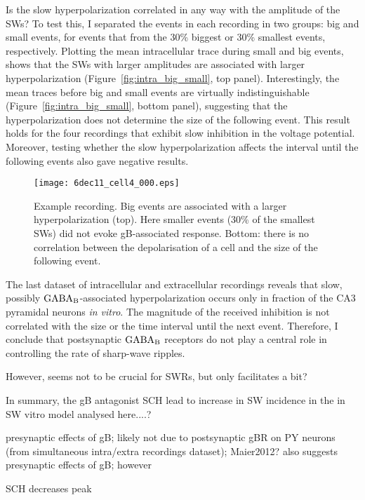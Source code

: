     Is the slow hyperpolarization correlated in any way with the amplitude of
    the SWs? To test this, I separated the events in each recording in two
    groups: big and small events, for events that from the 30\% biggest or 30\%
    smallest events, respectively. Plotting the mean intracellular trace during
    small and big events, shows that the SWs with larger amplitudes are
    associated with larger hyperpolarization (Figure~\ref{fig:intra_big_small},
    top panel). Interestingly, the mean traces before big and small events are
    virtually indistinguishable (Figure~\ref{fig:intra_big_small}, bottom
    panel), suggesting that the hyperpolarization does not determine the size
    of the following event. This result holds for the four recordings that
    exhibit slow inhibition in the voltage potential. Moreover, testing whether
    the slow hyperpolarization affects the interval until the following events
    also gave negative results.

    \begin{figure}
      \texttt{[image: 6dec11\_cell4\_000.eps]}
      \caption{ Example recording. Big events are associated with a larger
        hyperpolarization (top). Here smaller events (30\% of the smallest
        SWs) did not evoke gB-associated response. Bottom: there is no
        correlation between the depolarisation of a cell and the size of the
        following event.
              }
    \end{figure}

    The last dataset of intracellular and extracellular recordings reveals that
    slow, possibly $\rm GABA_B$-associated hyperpolarization occurs only in
    fraction of the CA3 pyramidal neurons {\textit{in vitro}}. The magnitude of
    the received inhibition is not correlated with the size or the time
    interval until the next event. Therefore, I conclude that postsynaptic $\rm
    GABA_B$ receptors do not play a central role in controlling the rate of
    sharp-wave ripples.
 
    However, seems not to be crucial for SWRs, but only facilitates a bit?

    In summary, the gB antagonist SCH lead to increase in SW incidence in the in SW vitro model analysed here....?

    presynaptic effects of gB; likely not due to postsynaptic gBR on PY neurons (from simultaneous intra/extra recordings dataset); Maier2012? also suggests presynaptic effects of gB; however
      
    SCH decreases peak
      
